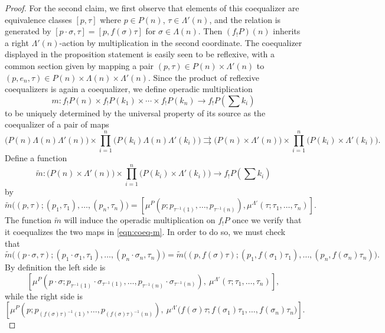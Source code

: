 \begin{proof}
For the second claim, we first observe that elements of this coequalizer are equivalence classes $[p,\tau]$ where $p \in P(n)$, $\tau \in \Lambda'(n)$, and the relation is generated by $[p\cdot \sigma, \tau] = [p, f(\sigma)\tau]$ for $\sigma \in \Lambda(n)$. Then $(f_{!}P)(n)$ inherits a right $\Lambda'(n)$-action by multiplication in the second coordinate.
The coequalizer displayed in the proposition statement is easily seen to be reflexive, with a common section given by mapping a pair $(p, \tau) \in P(n) \times \Lambda'(n)$ to $(p, e_n, \tau) \in P(n) \times \Lambda(n) \times \Lambda'(n)$. Since the product of reflexive coequalizers is again a coequalizer, we define operadic multiplication
\[
m \colon f_{!}P(n) \times f_{!}P(k_1) \times \cdots \times f_{!}P(k_n) \to f_{!}P\left( \sum k_i\right)
\]
to be uniquely determined by the universal property of its source as the coequalizer of a pair of maps 
\begin{equation}\label{eqn:coeq-m}
\big( P(n) \Lambda(n) \Lambda'(n) \big) \times \prod_{i=1}^n \big( P(k_i) \Lambda(n) \Lambda'(k_i) \big) \rightrightarrows \big( P(n) \times \Lambda'(n) \big) \times \prod_{i=1}^n \big( P(k_i) \times \Lambda'(k_i) \big).
\end{equation}
Define a function
\[
\tilde{m} \colon \big( P(n) \times \Lambda'(n) \big) \times \prod_{i=1}^n \big( P(k_i) \times \Lambda'(k_i) \big) \to f_{!}P\left( \sum k_i\right)
\]
by 
\[
\tilde{m}\big( (p,\tau); (p_1, \tau_1), \ldots, (p_n, \tau_n) \big) = \left[ \mu^P(p; p_{\tau^{-1}(1)}, \ldots, p_{\tau^{-1}(n)}), \mu^{\Lambda'}(\tau; \tau_1, \ldots, \tau_n) \right].
\]
The function $\tilde{m}$ will induce the operadic multiplication on $f_{!}P$ once we verify that it coequalizes the two maps in \cref{eqn:coeq-m}.
In order to do so, we must check that
\[
\tilde{m}\big( (p\cdot \sigma,\tau); (p_1\cdot\sigma_1, \tau_1), \ldots, (p_n\cdot\sigma_n, \tau_n) \big) = \tilde{m}\big( (p,f(\sigma)\tau); (p_1, f(\sigma_1)\tau_1), \ldots, (p_n, f(\sigma_n)\tau_n) \big).
\]
By definition the left side is
\begin{equation}\label{eqn:lhs-fshriek}
\left[ \mu^{P}(p\cdot\sigma; p_{\tau^{-1}(1)}\cdot\sigma_{\tau^{-1}(1)}, \ldots, p_{\tau^{-1}(n)}\cdot\sigma_{\tau^{-1}(n)}),\  \mu^{\Lambda'}(\tau; \tau_1, \ldots, \tau_n)            \right],
\end{equation}
while the right side is
\begin{equation}\label{eqn:rhs-fshriek}
\left[\mu^P(p; p_{(f(\sigma)\tau)^{-1}(1)}, \ldots, p_{(f(\sigma)\tau)^{-1}(n)}), \ \mu^{\Lambda'}\big( f(\sigma)\tau; f(\sigma_1)\tau_1, \ldots, f(\sigma_n)\tau_n\big)          \right].

\end{equation}
\end{proof}
